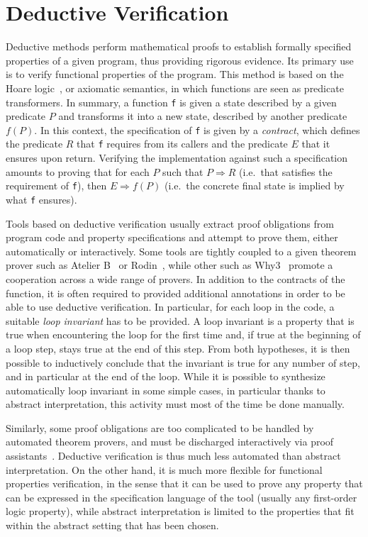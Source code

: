 \section{Deductive Verification}
\label{sec:deduct-verif}
Deductive methods
\cite{Beckert.Marche.2010}
\cite{Ledinot.Pariente.2010}\nocite{Beckert.Marche.2010}\cite{Abrial1996}
\cite{Abrial2005}
perform mathematical proofs to establish formally specified properties
of a given program, thus providing rigorous evidence. Its primary use is to
verify functional properties of the program.
This method is based on the Hoare logic~\cite{Hoare.1969,Hoare.Wirth.1973},
or axiomatic semantics, in
which functions are seen as predicate transformers. In summary, a function
\texttt{f}
is given a state described by a given predicate $P$ and transforms 
it into a new state, described by another predicate $f(P)$.
In this context, the specification of \texttt{f} is given by a \emph{contract}, 
which defines the predicate $R$ that \texttt{f} requires from its callers and
the predicate $E$ that it ensures upon return. Verifying the implementation
against such a specification amounts to proving that for each $P$ such that
$P\Rightarrow R$ (i.e.\ that satisfies the requirement of \texttt{f}), then
$E\Rightarrow f(P)$ 
(i.e.\ the concrete final state is implied by what \texttt{f} ensures).

%
Tools based on deductive verification usually extract proof
obligations from program code and property specifications and attempt
to prove them, either automatically or interactively. Some tools are
tightly coupled to a given theorem prover such as Atelier
B~\cite{atelierb} or Rodin~\cite{rodin}, while other such as
Why3~\cite{why3} promote a cooperation across a wide range of provers.
%
In addition to the contracts of the function, it is often required to provided
additional annotations in order to be able to use deductive verification. In
particular, for each loop in the code, a suitable \emph{loop invariant} has
to be provided. A loop invariant is a property that is true when encountering
the loop for the first time and, if true at the beginning of a loop step, stays
true at the end of this step. From both hypotheses, it is then possible to
inductively conclude that the invariant is true for any number of step, and in
particular at the end of the loop. While it is possible to synthesize
automatically loop invariant in some simple cases, in particular thanks to
abstract interpretation, this activity must most of the time be done manually.

Similarly, some proof obligations are too complicated to be handled by automated
theorem provers, and must be discharged interactively via proof
assistants~\cite{coq,isabelle}. Deductive verification is thus much less
automated than abstract interpretation. On the other hand, it is much more
flexible for functional properties verification, in the sense that it can be
used to prove any property that can be expressed in the specification language
of the tool (usually any first-order logic property), while abstract
interpretation is limited to the properties that fit within the abstract setting
that has been chosen.

